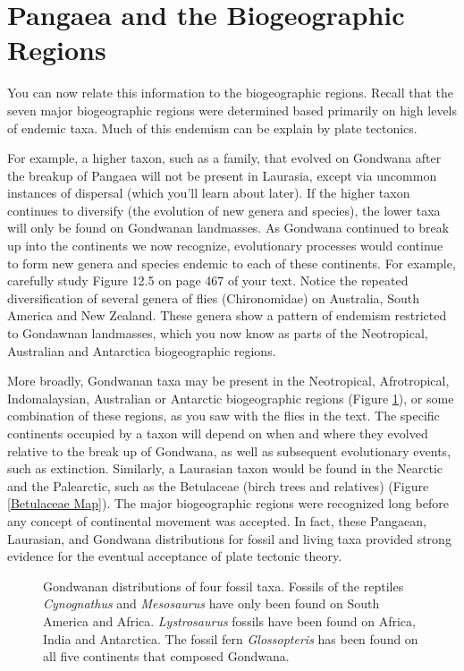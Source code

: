 \documentclass[11pt, oneside]{article}   	%
\begin{document}
\section{Pangaea and the Biogeographic Regions}

You can now relate this information to the biogeographic regions. Recall that the seven major biogeographic regions were determined based primarily on high levels of endemic taxa. Much of this endemism can be explain by plate tectonics. 

For example, a higher taxon, such as a family, that evolved on Gondwana after the breakup of Pangaea will not be present in Laurasia, except via uncommon instances of dispersal (which you'll learn about later). If the higher taxon continues to diversify (the evolution of new genera and species), the lower taxa will only be found on Gondwanan landmasses. As Gondwana continued to break up into the continents we now recognize, evolutionary processes would continue to form new genera and species endemic to each of these continents. For example, carefully study Figure 12.5 on page 467 of your text. Notice the repeated diversification of several genera of flies (Chironomidae) on Australia, South America and New Zealand. These genera show a pattern of endemism restricted to Gondawnan landmasses, which you  now know as parts of the Neotropical, Australian and Antarctica biogeographic regions.

More broadly, Gondwanan taxa may be present in the Neotropical, Afrotropical, Indomalaysian, Australian or Antarctic biogeographic regions (Figure \ref{Gondwana Distributions}), or some combination of these regions, as you saw with the flies in the text. The specific continents occupied by a taxon will depend on when and where they evolved relative to the break up of Gondwana, as well as subsequent evolutionary events, such as extinction.  Similarly, a Laurasian taxon would be found in the Nearctic and the Palearctic, such as the Betulaceae (birch trees and relatives) (Figure \ref{Betulaceae Map}). The major biogeographic regions were recognized long before any concept of continental movement was accepted.  In fact, these Pangaean, Laurasian, and Gondwana distributions for fossil and living taxa provided strong evidence for the eventual acceptance of plate tectonic theory. 

\begin{figure}[tb]
	\centering
		\caption{Gondwanan distributions of four fossil taxa. Fossils of the reptiles \emph{Cynognathus} and \emph{Mesosaurus} have only been found on South America and Africa. \emph{Lystrosaurus} fossils have been found on Africa, India and Antarctica. The fossil fern \emph{Glossopteris} has been found on all five continents that composed Gondwana.\label{Gondwana Distributions}}
		
\end{figure}
\end{document}
